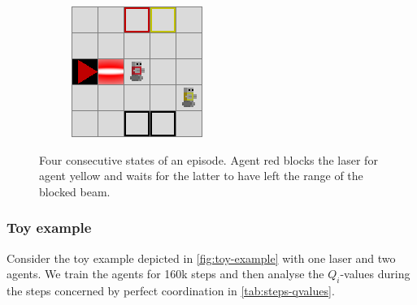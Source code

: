 \begin{figure}[t]
\begin{subfigure}[b]{0.24\textwidth}
         \caption{}
         \label{fig:step3-crossing}
    \end{subfigure}
    \begin{subfigure}[b]{0.24\textwidth}
         \includegraphics[width=\linewidth]{images/step_4.png}
         \caption{}
         \label{fig:step4-passed}
    \end{subfigure}
    \caption{Four consecutive states of an episode. Agent red blocks the laser for agent yellow and waits for the latter to have left the range of the blocked beam.}
    \label{fig:toy-example}
\end{figure}

\subsubsection{Toy example} Consider the toy example depicted in \autoref{fig:toy-example} with one laser and two agents. We train the agents for 160k steps and then analyse the $Q_i$-values during the steps concerned by perfect coordination in \autoref{tab:steps-qvalues}.


